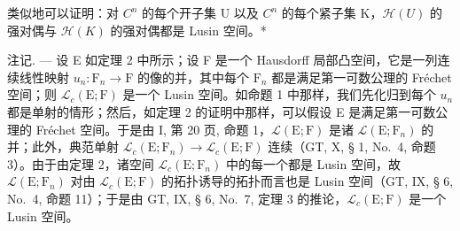 类似地可以证明：对 \(C^{n}\) 的每个开子集 U 以及 \(C^{n}\) 的每个紧子集 K，\(\mathcal{H}(U)\) 的强对偶与 \(\mathcal{H}(K)\) 的强对偶都是 Lusin 空间。*

注记. --- 设 E 如定理 2 中所示；设 F 是一个 Hausdorff 局部凸空间，它是一列连续线性映射 \(u_n: \mathrm{F}_n \to \mathrm{F}\) 的像的并，其中每个 \(\mathrm{F}_n\) 都是满足第一可数公理的 Fréchet 空间；则 \(\mathcal{L}_c(\mathrm{E};\mathrm{F})\) 是一个 Lusin 空间。如命题 1 中那样，我们先化归到每个 \(u_n\) 都是单射的情形；然后，如定理 2 的证明中那样，可以假设 E 是满足第一可数公理的 Fréchet 空间。于是由 I, 第 20 页, 命题 1，\(\mathcal{L}(\mathrm{E};\mathrm{F})\) 是诸 \(\mathcal{L}(\mathrm{E};\mathrm{F}_n)\) 的并；此外，典范单射 \(\mathcal{L}_c(\mathrm{E};\mathrm{F}_n) \to \mathcal{L}_c(\mathrm{E};\mathrm{F})\) 连续（GT, X, § 1, No.~4, 命题 3）。由于由定理 2，诸空间 \(\mathcal{L}_c(\mathrm{E};\mathrm{F}_n)\) 中的每一个都是 Lusin 空间，故 \(\mathcal{L}(\mathrm{E};\mathrm{F}_n)\) 对由 \(\mathcal{L}_c(\mathrm{E};\mathrm{F})\) 的拓扑诱导的拓扑而言也是 Lusin 空间（GT, IX, § 6, No.~4, 命题 11）；于是由 GT, IX, § 6, No.~7, 定理 3 的推论，\(\mathcal{L}_c(\mathrm{E};\mathrm{F})\) 是一个 Lusin 空间。

